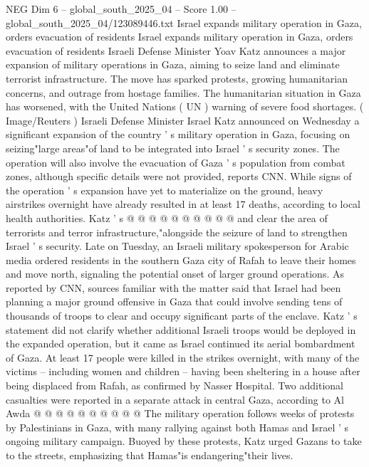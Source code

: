 \begin{textsample}{NEG Dim 6 – global\_south\_2025\_04 – Score 1.00 – global\_south\_2025\_04/123089446.txt}  \label{ex:f6_neg_176}
Israel expands military operation in Gaza, orders evacuation of residents Israel expands military operation in Gaza, orders evacuation of residents Israeli Defense Minister Yoav Katz announces a major expansion of military operations in Gaza, aiming to seize land and eliminate terrorist infrastructure.
The move has sparked protests, growing humanitarian concerns, and outrage from hostage families.
The humanitarian situation in Gaza has worsened, with the United Nations ( UN ) warning of severe food shortages. ( Image/Reuters ) Israeli Defense Minister Israel Katz announced on Wednesday a significant expansion of the country ' s military operation in Gaza, focusing on seizing"large areas"of land to be integrated into Israel ' s security zones.
The operation will also involve the evacuation of Gaza ' s population from combat zones, although specific details were not provided, reports CNN.
While signs of the operation ' s expansion have yet to materialize on the ground, heavy airstrikes overnight have already resulted in at least 17 deaths, according to local health authorities.
Katz ' s @ @ @ @ @ @ @ @ @ @ and clear the area of terrorists and terror infrastructure,"alongside the seizure of land to strengthen Israel ' s security.
Late on Tuesday, an Israeli military spokesperson for Arabic media ordered residents in the southern Gaza city of Rafah to leave their homes and move north, signaling the potential onset of larger ground operations.
As reported by CNN, sources familiar with the matter said that Israel had been planning a major ground offensive in Gaza that could involve sending tens of thousands of troops to clear and occupy significant parts of the enclave.
Katz ' s statement did not clarify whether additional Israeli troops would be deployed in the expanded operation, but it came as Israel continued its aerial bombardment of Gaza.
At least 17 people were killed in the strikes overnight, with many of the victims -- including women and children -- having been sheltering in a house after being displaced from Rafah, as confirmed by Nasser Hospital.
Two additional casualties were reported in a separate attack in central Gaza, according to Al Awda @ @ @ @ @ @ @ @ @ @ The military operation follows weeks of protests by Palestinians in Gaza, with many rallying against both Hamas and Israel ' s ongoing military campaign.
Buoyed by these protests, Katz urged Gazans to take to the streets, emphasizing that Hamas"is endangering"their lives.

\end{textsample}
